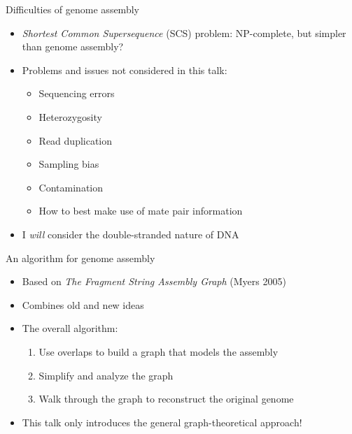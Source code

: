 \documentclass[xcolor=dvipsnames]{beamer}
\begin{document}
\begin{frame}{Difficulties of genome assembly}
    \begin{itemize}
        \item {\em Shortest Common Supersequence} (SCS) problem:
              NP-complete, but simpler than genome assembly?
        \item Problems and issues not considered in this talk:
            \begin{itemize}
                \item Sequencing errors
                \item Heterozygosity
                \item Read duplication
                \item Sampling bias
                \item Contamination
                \item How to best make use of mate pair information
            \end{itemize}
        \item I {\em will} consider the double-stranded nature of DNA
    \end{itemize}
\end{frame}

\begin{frame}{An algorithm for genome assembly}
    \begin{itemize}
        \item Based on {\it The Fragment String Assembly Graph} (Myers 2005)
        \item Combines old and new ideas
        \item The overall algorithm:
        \begin{enumerate}
            \item Use overlaps to build a graph that models the assembly
            \item Simplify and analyze the graph
            \item Walk through the graph to reconstruct the original genome
        \end{enumerate}
        \item This talk only introduces the general graph-theoretical approach!
    \end{itemize}
\end{frame}
\end{document}
